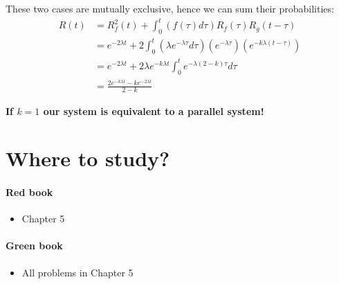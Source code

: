 These two cases are mutually exclusive, hence we can sum their probabilities:
\begin{equation*}
    \begin{split}
        R(t) &= R_f^2(t) + \int_0^t (f(\tau)d\tau)R_f(\tau)R_g(t-\tau) \\
        &= e^{-2\lambda t} + 2\int_0^{t} (\lambda e^{-\lambda \tau} d\tau) (e^{-\lambda\tau})(e^{-k\lambda(t-\tau)}) \\
        &= e^{-2\lambda t} + 2\lambda e^{-k\lambda t}\int_0^t e^{-\lambda(2-k)\tau}d\tau \\
        &= \frac{2e^{-k\lambda t} - ke^{-2\lambda t}}{2-k} 
    \end{split}
\end{equation*}

\textbf{If $k=1$ our system is equivalent to a parallel system!}

\section{Where to study?}
\paragraph*{\color{BrickRed}Red book}
\begin{itemize}
    \item Chapter 5
\end{itemize}

\paragraph*{\color{PineGreen}Green book}
\begin{itemize}
    \item All problems in Chapter 5
\end{itemize}